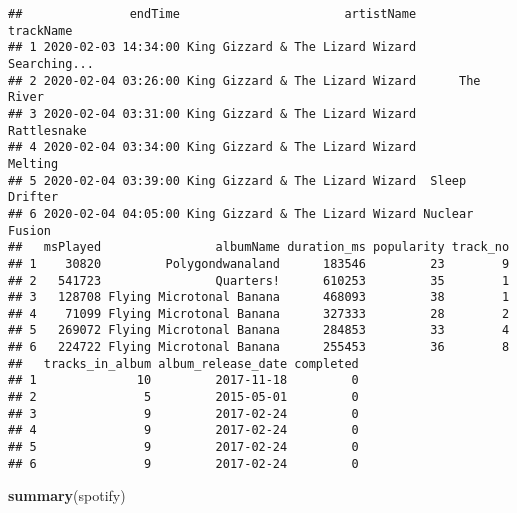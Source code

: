 \documentclass[]{article}
\newenvironment{Shaded}{\begin{snugshade}}{\end{snugshade}}
\newcommand{\KeywordTok}[1]{\textcolor[rgb]{0.13,0.29,0.53}{\textbf{#1}}}
\newcommand{\NormalTok}[1]{#1}
\begin{document}
\begin{verbatim}
##               endTime                       artistName      trackName
## 1 2020-02-03 14:34:00 King Gizzard & The Lizard Wizard   Searching...
## 2 2020-02-04 03:26:00 King Gizzard & The Lizard Wizard      The River
## 3 2020-02-04 03:31:00 King Gizzard & The Lizard Wizard    Rattlesnake
## 4 2020-02-04 03:34:00 King Gizzard & The Lizard Wizard        Melting
## 5 2020-02-04 03:39:00 King Gizzard & The Lizard Wizard  Sleep Drifter
## 6 2020-02-04 04:05:00 King Gizzard & The Lizard Wizard Nuclear Fusion
##   msPlayed                albumName duration_ms popularity track_no
## 1    30820         Polygondwanaland      183546         23        9
## 2   541723                Quarters!      610253         35        1
## 3   128708 Flying Microtonal Banana      468093         38        1
## 4    71099 Flying Microtonal Banana      327333         28        2
## 5   269072 Flying Microtonal Banana      284853         33        4
## 6   224722 Flying Microtonal Banana      255453         36        8
##   tracks_in_album album_release_date completed
## 1              10         2017-11-18         0
## 2               5         2015-05-01         0
## 3               9         2017-02-24         0
## 4               9         2017-02-24         0
## 5               9         2017-02-24         0
## 6               9         2017-02-24         0
\end{verbatim}

\begin{Shaded}
\begin{Highlighting}[]
\KeywordTok{summary}\NormalTok{(spotify)}
\end{Highlighting}
\end{Shaded}
\end{document}
